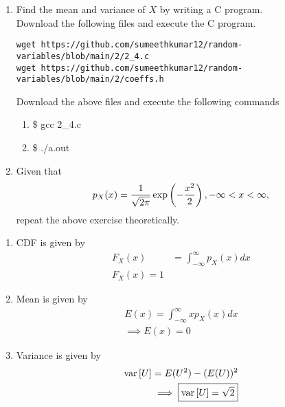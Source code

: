 \documentclass[journal,12pt,twocolumn]{IEEEtran}
\begin{document}
\begin{enumerate}[label=\thesection.\arabic*
,ref=\thesection.\theenumi]
\begin{enumerate}
    \item \$ python3 2\_3.py
\end{enumerate}
\begin{figure}[!h]
\centering
\texttt{[image: 2\_3pdfgau.png]}
\caption{The PDF of $X$}
\label{fig:2.3}
\end{figure}
Some of the properties of the PDF:
\begin{enumerate}
    \item Symmetric about $x=\mu$
    \item decreasing function for $x<\mu$ and increasing for $x>\mu$ and attains maximum at $x=\mu$
    \item Area under the curve is unity.
    
\end{enumerate}
\item Find the mean and variance of $X$ by writing a C program.\\
\solution Download the following files and execute the  C program.
\begin{lstlisting}
wget https://github.com/sumeethkumar12/random-variables/blob/main/2/2_4.c
wget https://github.com/sumeethkumar12/random-variables/blob/main/2/coeffs.h
\end{lstlisting}
Download the above files and execute the following commands
\begin{enumerate}
    \item \$ gcc 2\_4.c
    \item \$ ./a.out
    \end{enumerate}
\item Given that 
\begin{align}
p_{X}(x) = \frac{1}{\sqrt{2\pi}}\exp\left(-\frac{x^2}{2}\right), -\infty < x < \infty,
\end{align}
repeat the above exercise theoretically.
\end{enumerate}
\solution 
\begin{enumerate}
    \item CDF is given by 
    \begin{align}
        F_X(x)&=\int_{-\infty}^{\infty}p_X(x)dx\\
        \boxed{F_X(x)=1}
    \end{align}
    \item Mean is given by
    \begin{align}
        E(x)=\int_{-\infty}^{\infty}xp_X(x)dx\\
        \implies \boxed{E(x)=0}
    \end{align}
    \item Variance is given by
    \begin{align}
        \text{var}{}\left[U\right]=E(U^2)-(E(U))^2\\
        \implies\boxed{\text{var}{}\left[U\right]=\sqrt{2}}
    \end{align}
\end{enumerate}
\end{document}
